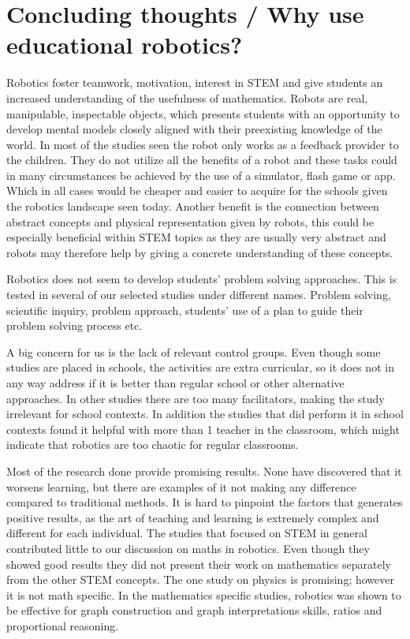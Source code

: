 \chapter{Concluding thoughts / Why use educational robotics?}\label{ch:literatureConclusion}
Robotics foster teamwork, motivation, interest in STEM and give students an increased understanding of the usefulness of mathematics. Robots are real, manipulable, inspectable objects, which presents students with an opportunity to develop mental models closely aligned with their preexisting knowledge of the world. In most of the studies seen the robot only works as a feedback provider to the children. They do not utilize all the benefits of a robot and these tasks could in many circumstances be achieved by the use of a simulator, flash game or app. Which in all cases would be cheaper and easier to acquire for the schools given the robotics landscape seen today. Another benefit is the connection between abstract concepts and physical representation given by robots, this could be especially beneficial within STEM topics as they are usually very abstract and robots may therefore help by giving a concrete understanding of these concepts.

\bigskip\noindent
Robotics does not seem to develop students' problem solving approaches. This is tested in several of our selected studies under different names. Problem solving, scientific inquiry, problem approach, students' use of a plan to guide their problem solving process etc.

\bigskip\noindent
A big concern for us is the lack of relevant control groups. Even though some studies are placed in schools, the activities are extra curricular, so it does not in any way address if it is better than regular school or other alternative approaches. In other studies there are too many facilitators, making the study irrelevant for school contexts. In addition the studies that did perform it in school contexts found it helpful with more than 1 teacher in the classroom, which might indicate that robotics are too chaotic for regular classrooms. 

\bigskip\noindent
Most of the research done provide promising results. None have discovered that it worsens learning, but there are examples of it not making any difference compared to traditional methods. It is hard to pinpoint the factors that generates positive results, as the art of teaching and learning is extremely complex and different for each individual. The studies that focused on STEM in general contributed little to our discussion on maths in robotics. Even though they showed good results they did not present their work on mathematics separately from the other STEM concepts. The one study on physics is promising; however it is not math specific. In the mathematics specific studies, robotics was shown to be effective for graph construction and graph interpretations skills, ratios and proportional reasoning. 

